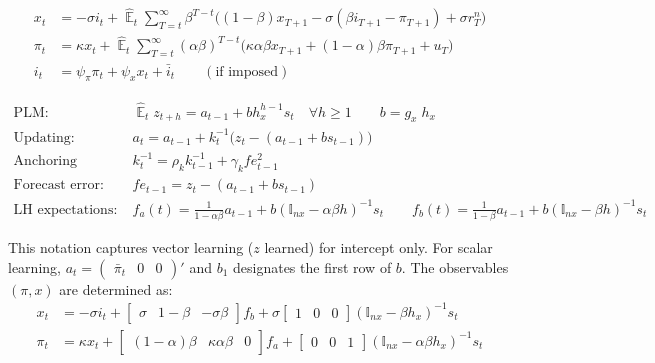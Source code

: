 \documentclass[11pt]{article}
\renewcommand{\[}{\begin{equation}}
\renewcommand{\]}{\end{equation}}
\DeclareMathOperator{\E}{\mathbb{E}}
\begin{document}
\vspace{-0.5cm}

\begin{align}
x_t &=  -\sigma i_t +\hat{\E}_t \sum_{T=t}^{\infty} \beta^{T-t }\big( (1-\beta)x_{T+1} - \sigma(\beta i_{T+1} - \pi_{T+1}) +\sigma r_T^n \big)  \label{A1}  \\
\pi_t &= \kappa x_t +\hat{\E}_t \sum_{T=t}^{\infty} (\alpha\beta)^{T-t }\big( \kappa \alpha \beta x_{T+1} + (1-\alpha)\beta \pi_{T+1} + u_T\big) \label{A2}  \\
i_t &= \psi_{\pi}\pi_t + \psi_{x} x_t  + \bar{i}_t \label{TR} \quad \quad (\text{if imposed})
\end{align}

\vspace{-1.2cm}

\begin{align}
\text{PLM:} \quad \quad & \hat{\E}_t z_{t+h}  =  a_{t-1} + bh_x^{h-1}s_t  \quad \forall h\geq 1 \quad \quad b = g_x\; h_x \quad \quad  \label{PLM} \\
\text{Updating:} \quad \quad & a_{t}  =a_{t-1} +k_t^{-1}\big(z_{t} -(a_{t-1}+b s_{t-1}) \big)  \label{A5} \\
\text{Anchoring function:} \quad \quad & k^{-1}_t  = \rho_k k^{-1}_{t-1} + \gamma_k fe_{t-1}^2 \label{A6}\\
\text{Forecast error:} \quad \quad & fe_{t-1}  = z_t - (a_{t-1}+b s_{t-1}) \label{A7} \\
\text{LH expectations:} \quad \quad & f_a(t) = \frac{1}{1-\alpha\beta}a_{t-1}  + b(\mathbb{I}_{nx} - \alpha\beta h)^{-1}s_t \quad \quad  f_b(t) = \frac{1}{1-\beta}a_{t-1}  + b(\mathbb{I}_{nx} - \beta h)^{-1}s_t  \label{A8}
\end{align}

\vspace{-0.5cm}

This notation captures vector learning ($z$ learned) for intercept only. For scalar learning, $a_t= \begin{pmatrix} \bar{\pi}_t & 0 & 0\end{pmatrix}' $ and $b_1$ designates the first row of $b$. The observables $(\pi, x)$ are determined as:
\begin{align}
x_t &=  -\sigma i_t + \begin{bmatrix} \sigma & 1-\beta & -\sigma\beta \end{bmatrix} f_b + \sigma \begin{bmatrix} 1 & 0 & 0 \end{bmatrix} (\mathbb{I}_{nx} - \beta h_x)^{-1} s_t \label{A9} \\
\pi_t &= \kappa x_t  + \begin{bmatrix} (1-\alpha)\beta & \kappa\alpha\beta & 0 \end{bmatrix}  f_a + \begin{bmatrix} 0 & 0 & 1 \end{bmatrix}  (\mathbb{I}_{nx} - \alpha \beta h_x)^{-1}  s_t \label{A10}
\end{align}
\end{document}
